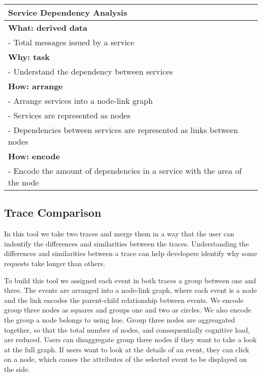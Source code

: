 \begin{center}
    \begin{tabular}{|p{}|}
        \hline
        \textbf{Service Dependency Analysis}                                   \\
        \hline
        \textbf{What: derived data}                                            \\
        - Total messages issued by a service                                   \\
        \hline
        \textbf{Why: task}                                                     \\
        - Understand the dependency between services                           \\
        \hline
        \textbf{How: arrange}                                                  \\
        - Arrange services into a node-link graph                              \\
        - Services are represented as nodes                                    \\
        - Dependencies between services are represented as links between nodes \\
        \textbf{How: encode}                                                   \\
        - Encode the amount of dependencies in a service with the area
        of the node                                                            \\
        \hline
    \end{tabular}
\end{center}


\subsection{Trace Comparison}

In this tool we take two traces and merge them in a way that the user can indentify the
differences and similarities between the traces. Understanding the differences and similarities
between a trace can help developers identify why some requests take longer than others.

To build this tool we assigned each event in both traces a group between one and three. The events are arranged into a node-link graph,
where each event is a node and the link encodes the parent-child relationship between events. We encode group three nodes as squares and groups one and two as circles.
We also encode the group a node belongs to using hue. Group three nodes are aggreagated together, so that the total number of nodes, and consequentially cognitive load, are reduced.
Users can disaggregate group three nodes if they
want to take a look at the full graph. If users want to look at the details of an event, they can click on a node, which causes the attributes of the selected event
to be displayed on the side.

